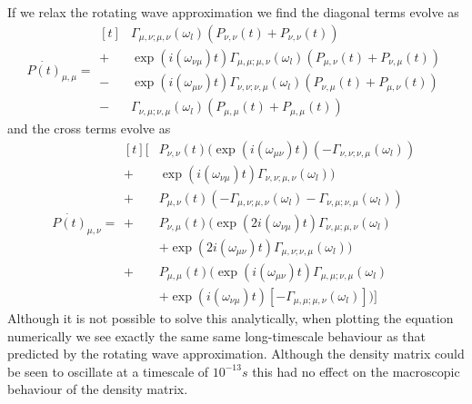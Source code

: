 \subsection{}
If we relax the rotating wave approximation
we find the diagonal terms evolve as
\begin{equation}
  \dot{P(t)}_{\mu, \mu} = \begin{aligned}[t]
      & \Gamma_{\mu, \nu; \mu, \nu}(\omega_l)
    (P_{\nu, \nu}(t) + P_{\nu, \nu}(t))       \\
    + & \exp{(i(\omega_{\nu \mu})t)}
    \Gamma_{\mu, \mu; \mu, \nu}(\omega_l)
    (P_{\mu, \nu}(t) + P_{\nu, \mu}(t))       \\
    - & \exp{(i(\omega_{\mu \nu})t)}
    \Gamma_{\nu, \nu; \nu, \mu}(\omega_l)
    (P_{\nu, \mu}(t) + P_{\mu, \nu}(t))       \\
    - & \Gamma_{\nu, \mu; \nu, \mu}(\omega_l)
    (P_{\mu, \mu}(t) + P_{\mu, \mu}(t))
  \end{aligned}
\end{equation}
and the cross terms evolve as
\begin{equation}
  \dot{P(t)}_{\mu, \nu}= \begin{aligned}[t]
    [ & P_{\nu, \nu}(t)(
      \exp{(i(\omega_{\mu \nu})t)}
    (- \Gamma_{\nu, \nu; \nu, \mu}(\omega_l))                                                   \\
    + & \exp{(i(\omega_{\nu \mu})t)}
    \Gamma_{\nu, \nu; \mu, \nu}(\omega_l) )                                                     \\
    + & P_{\mu, \nu}(t)(
    - \Gamma_{\mu, \nu; \mu, \nu}(\omega_l) - \Gamma_{\nu, \mu; \nu, \mu}(\omega_l))            \\
    + & P_{\nu, \mu}(t)(
    \exp{(2i(\omega_{\nu \mu})t)}\Gamma_{\nu, \mu; \mu, \nu}(\omega_l)                          \\
      & +                   \exp{(2i(\omega_{\mu \nu})t)}\Gamma_{\mu, \nu; \nu, \mu}(\omega_l)) \\
    + & P_{\mu, \mu}(t) (
    \exp{(i(\omega_{\mu \nu})t)}\Gamma_{\mu, \mu; \nu, \mu}(\omega_l)                           \\
      & + \exp{(i(\omega_{\nu \mu})t)}[
        - \Gamma_{\mu, \mu; \mu, \nu}(\omega_l)])]
  \end{aligned}
\end{equation}
Although it is not possible to solve
this analytically, when plotting the
equation numerically we see
exactly the same same long-timescale
behaviour as that predicted by the
rotating wave approximation. Although the density
matrix could be seen to oscillate at a timescale of
\(10^{-13}s\) this had no effect on the macroscopic
behaviour of the density matrix.

